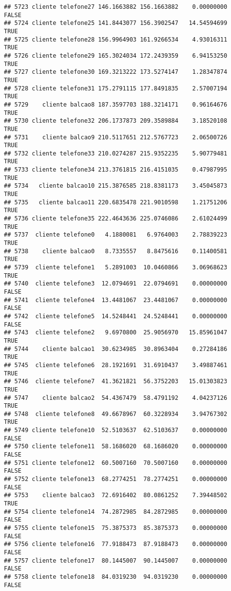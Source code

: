 \documentclass[
]{article}
\begin{document}
\begin{verbatim}
## 5723 cliente telefone27 146.1663882 156.1663882    0.00000000    FALSE
## 5724 cliente telefone25 141.8443077 156.3902547   14.54594699     TRUE
## 5725 cliente telefone28 156.9964903 161.9266534    4.93016311     TRUE
## 5726 cliente telefone29 165.3024034 172.2439359    6.94153250     TRUE
## 5727 cliente telefone30 169.3213222 173.5274147    1.28347874     TRUE
## 5728 cliente telefone31 175.2791115 177.8491835    2.57007194     TRUE
## 5729    cliente balcao8 187.3597703 188.3214171    0.96164676     TRUE
## 5730 cliente telefone32 206.1737873 209.3589884    3.18520108     TRUE
## 5731    cliente balcao9 210.5117651 212.5767723    2.06500726     TRUE
## 5732 cliente telefone33 210.0274287 215.9352235    5.90779481     TRUE
## 5733 cliente telefone34 213.3761815 216.4151035    0.47987995     TRUE
## 5734   cliente balcao10 215.3876585 218.8381173    3.45045873     TRUE
## 5735   cliente balcao11 220.6835478 221.9010598    1.21751206     TRUE
## 5736 cliente telefone35 222.4643636 225.0746086    2.61024499     TRUE
## 5737  cliente telefone0   4.1880081   6.9764003    2.78839223     TRUE
## 5738    cliente balcao0   8.7335557   8.8475616    0.11400581     TRUE
## 5739  cliente telefone1   5.2891003  10.0460866    3.06968623     TRUE
## 5740  cliente telefone3  12.0794691  22.0794691    0.00000000    FALSE
## 5741  cliente telefone4  13.4481067  23.4481067    0.00000000    FALSE
## 5742  cliente telefone5  14.5248441  24.5248441    0.00000000    FALSE
## 5743  cliente telefone2   9.6970800  25.9056970   15.85961047     TRUE
## 5744    cliente balcao1  30.6234985  30.8963404    0.27284186     TRUE
## 5745  cliente telefone6  28.1921691  31.6910437    3.49887461     TRUE
## 5746  cliente telefone7  41.3621821  56.3752203   15.01303823     TRUE
## 5747    cliente balcao2  54.4367479  58.4791192    4.04237126     TRUE
## 5748  cliente telefone8  49.6678967  60.3228934    3.94767302     TRUE
## 5749 cliente telefone10  52.5103637  62.5103637    0.00000000    FALSE
## 5750 cliente telefone11  58.1686020  68.1686020    0.00000000    FALSE
## 5751 cliente telefone12  60.5007160  70.5007160    0.00000000    FALSE
## 5752 cliente telefone13  68.2774251  78.2774251    0.00000000    FALSE
## 5753    cliente balcao3  72.6916402  80.0861252    7.39448502     TRUE
## 5754 cliente telefone14  74.2872985  84.2872985    0.00000000    FALSE
## 5755 cliente telefone15  75.3875373  85.3875373    0.00000000    FALSE
## 5756 cliente telefone16  77.9188473  87.9188473    0.00000000    FALSE
## 5757 cliente telefone17  80.1445007  90.1445007    0.00000000    FALSE
## 5758 cliente telefone18  84.0319230  94.0319230    0.00000000    FALSE

\end{verbatim}
\end{document}
